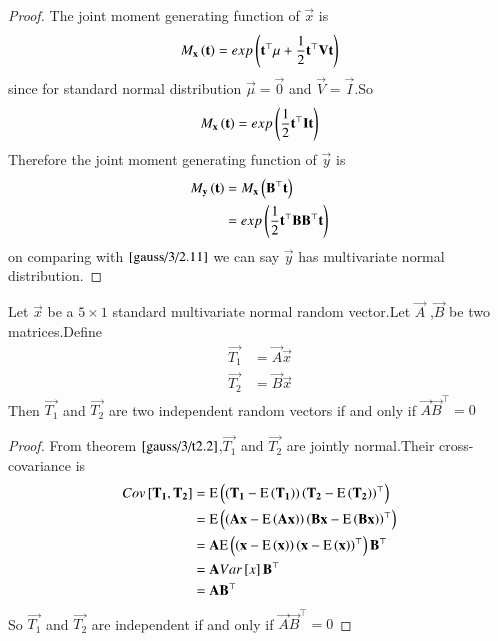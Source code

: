 \begin{proof}
The joint moment generating function of $\vec{x}$ is
\begin{align}
    M_{\mathbf{x}}\left(\mathbf{t}\right)=exp\left(\mathbf{t}^{\top}\mu+\frac{1}{2}\mathbf{t}^{\top}\mathbf{V}\mathbf{t}\right)
\end{align}
since for standard normal distribution $\vec{\mu}=\vec{0}$ and $\vec{V}=\vec{I}$.So
\begin{align}
     M_{\mathbf{x}}\left(\mathbf{t}\right)=exp\left(\frac{1}{2}\mathbf{t}^{\top}\mathbf{I}\mathbf{t}\right)\label{gauss/3/2.11}
\end{align}
Therefore the joint moment generating function of $\vec{y}$ is
\begin{align}
    M_{\mathbf{y}}\left(\mathbf{t}\right)&=M_{\mathbf{x}}\left(\mathbf{B}^{\top}\mathbf{t}\right)\\
    &=exp\left(\frac{1}{2}\mathbf{t}^{\top}\mathbf{B}\mathbf{B}^{\top}\mathbf{t}\right)
\end{align}
on comparing with $\eqref{gauss/3/2.11}$ we can say $\vec{y}$ has multivariate normal distribution. 
\end{proof}
\begin{theorem}
\label{gauss/3/t2.3}
Let $\vec{x}$ be a $5\times 1$ standard multivariate normal random vector.Let $\vec{A}$ ,$\vec{B}$ be two matrices.Define
\begin{align}
    \vec{T_1}&=\vec{A}\vec{x}\\
    \vec{T_2}&=\vec{B}\vec{x}
\end{align}
Then $\vec{T_1}$ and $\vec{T_2}$ are two independent random vectors if and only if $\vec{A}\vec{B}^{\top}=0$
\end{theorem}
\begin{proof}
From theorem $\ref{gauss/3/t2.2}$,$\vec{T_1}$ and $\vec{T_2}$ are jointly normal.Their cross-covariance is
\begin{align}
    Cov{}\left[\mathbf{T_1},\mathbf{T_2}\right]&=\text{E}\left( \left(\mathbf{T_1}-\text{E}\left( \mathbf{T_1} \right)\right)\left(\mathbf{T_2}-\text{E}\left( \mathbf{T_2} \right)\right)^{\top} \right)\\
    &=\text{E}\left( \left(\mathbf{A}\mathbf{x}-\text{E}\left( \mathbf{A}\mathbf{x} \right)\right)\left(\mathbf{B}\mathbf{x}-\text{E}\left( \mathbf{B}\mathbf{x} \right)\right)^{\top} \right)\\
    &=\mathbf{A}\text{E}\left( \left(\mathbf{x}-\text{E}\left( \mathbf{x} \right)\right)\left(\mathbf{x}-\text{E}\left( \mathbf{x} \right)\right)^{\top} \right)\mathbf{B}^{\top}\\
    &=\mathbf{A}Var{}\left[x\right]\mathbf{B}^{\top}\\
    &=\mathbf{A}\mathbf{B}^{\top}
\end{align}
So $\vec{T_1}$ and $\vec{T_2}$ are independent if and only if $\vec{A}\vec{B}^{\top}=0$
\end{proof}

